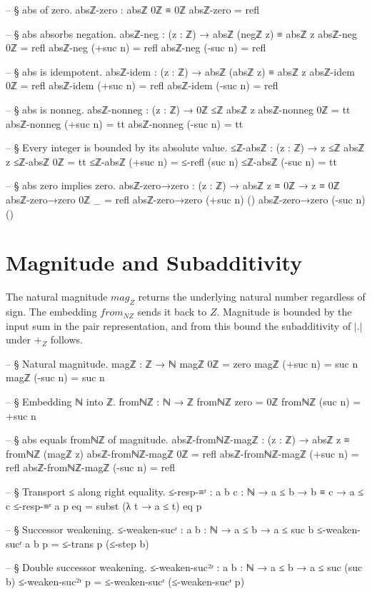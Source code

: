 \documentclass[11pt,a4paper]{book}
\def\cdot{.}%
\def\mathrm#1{#1}%
\def\mathbb#1{#1}%
\begin{document}
\begin{code}
-- § abs of zero.
absℤ-zero : absℤ 0ℤ ≡ 0ℤ
absℤ-zero = refl

-- § abs absorbs negation.
absℤ-neg : (z : ℤ) → absℤ (negℤ z) ≡ absℤ z
absℤ-neg 0ℤ = refl
absℤ-neg (+suc n) = refl
absℤ-neg (-suc n) = refl

-- § abs is idempotent.
absℤ-idem : (z : ℤ) → absℤ (absℤ z) ≡ absℤ z
absℤ-idem 0ℤ = refl
absℤ-idem (+suc n) = refl
absℤ-idem (-suc n) = refl

-- § abs is nonneg.
absℤ-nonneg : (z : ℤ) → 0ℤ ≤ℤ absℤ z
absℤ-nonneg 0ℤ = tt
absℤ-nonneg (+suc n) = tt
absℤ-nonneg (-suc n) = tt

-- § Every integer is bounded by its absolute value.
≤ℤ-absℤ : (z : ℤ) → z ≤ℤ absℤ z
≤ℤ-absℤ 0ℤ = tt
≤ℤ-absℤ (+suc n) = ≤-refl (suc n)
≤ℤ-absℤ (-suc n) = tt

-- § abs zero implies zero.
absℤ-zero→zero : (z : ℤ) → absℤ z ≡ 0ℤ → z ≡ 0ℤ
absℤ-zero→zero 0ℤ _ = refl
absℤ-zero→zero (+suc n) ()
absℤ-zero→zero (-suc n) ()
\end{code}

\section{Magnitude and Subadditivity}

The natural magnitude $\mathrm{mag}_{\mathbb{Z}}$ returns the underlying natural number regardless of sign.
The embedding $\mathrm{from}_{\mathbb{N}\mathbb{Z}}$ sends it back to $\mathbb{Z}$.
Magnitude is bounded by the input sum in the pair representation, and from this bound the subadditivity of $|{\cdot}|$ under $+_{\mathbb{Z}}$ follows.

\begin{code}
-- § Natural magnitude.
magℤ : ℤ → ℕ
magℤ 0ℤ = zero
magℤ (+suc n) = suc n
magℤ (-suc n) = suc n

-- § Embedding ℕ into ℤ.
fromℕℤ : ℕ → ℤ
fromℕℤ zero = 0ℤ
fromℕℤ (suc n) = +suc n

-- § abs equals fromℕℤ of magnitude.
absℤ-fromℕℤ-magℤ : (z : ℤ) → absℤ z ≡ fromℕℤ (magℤ z)
absℤ-fromℕℤ-magℤ 0ℤ = refl
absℤ-fromℕℤ-magℤ (+suc n) = refl
absℤ-fromℕℤ-magℤ (-suc n) = refl

-- § Transport ≤ along right equality.
≤-resp-≡ʳ : {a b c : ℕ} → a ≤ b → b ≡ c → a ≤ c
≤-resp-≡ʳ {a} p eq = subst (λ t → a ≤ t) eq p

-- § Successor weakening.
≤-weaken-sucʳ : {a b : ℕ} → a ≤ b → a ≤ suc b
≤-weaken-sucʳ {a} {b} p = ≤-trans p (≤-step b)

-- § Double successor weakening.
≤-weaken-suc²ʳ : {a b : ℕ} → a ≤ b → a ≤ suc (suc b)
≤-weaken-suc²ʳ p = ≤-weaken-sucʳ (≤-weaken-sucʳ p)
\end{code}
\end{document}
